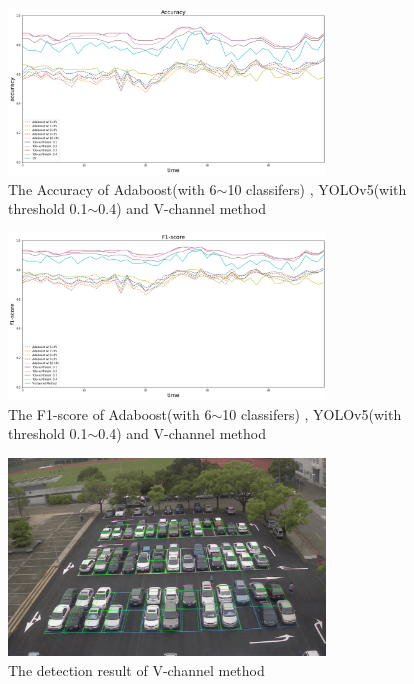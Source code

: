 \documentclass{article}[12pt, twocolumn]
\begin{document}
\begin{figure}[H]
    \centering
    \includegraphics[width=0.75\textwidth]{figure/Accuracy_v.png}
    \caption{The Accuracy of Adaboost(with 6$\sim$10 classifers)
    , YOLOv5(with threshold 0.1$\sim$0.4) and V-channel method}
\end{figure}

\begin{figure}[H]
    \centering
    \includegraphics[width=0.75\textwidth]{figure/F1-score_v.png}
    \caption{The F1-score of Adaboost(with 6$\sim$10 classifers)
    , YOLOv5(with threshold 0.1$\sim$0.4) and V-channel method}
\end{figure}

\begin{figure}[H]
    \centering
    \includegraphics[width=0.75\textwidth]{figure/CV_first_frame.png}
    \caption{The detection result of V-channel method}
\end{figure}
\end{document}
